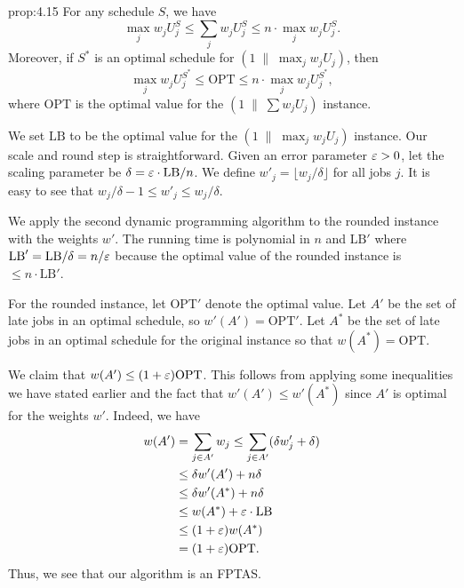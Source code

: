 \begin{prop}{prop:4.15}
    For any schedule $S$, we have 
    \[ \max_j w_j U_j^S \leq \sum_j w_j U_j^S \leq n \cdot \max_j w_j U_j^S. \] 
    Moreover, if $S^*$ is an optimal schedule for $(1\;\|\;\max_j w_jU_j)$, then 
    \[ \max_j w_j U_j^{S^*} \leq \text{OPT} \leq n \cdot \max_j w_j U_j^{S^*}, \] 
    where $\text{OPT}$ is the optimal value for the $(1\;\|\;\sum w_j U_j)$ instance. 
\end{prop}

We set $\text{LB}$ to be the optimal value for the $(1\;\|\;\max_j w_j U_j)$ 
instance. Our scale and round step is straightforward. Given an error 
parameter $\varepsilon > 0$, let the scaling parameter be $\delta = \varepsilon \cdot 
\text{LB}/n$. We define $w'_j = \lfloor w_j/\delta \rfloor$ for all jobs $j$. 
It is easy to see that $w_j/\delta - 1 \leq w'_j \leq w_j/\delta$. 

We apply the second dynamic programming algorithm to the rounded instance 
with the weights $w'$. The running time is polynomial in $n$ and 
$\text{LB}'$ where $\text{LB}' = \text{LB}/\delta = n/\varepsilon$ because 
the optimal value of the rounded instance is $\leq n \cdot \text{LB}'$.

For the rounded instance, let $\text{OPT}'$ denote the optimal value. 
Let $A'$ be the set of late jobs in an optimal schedule, so $w'(A') = 
\text{OPT}'$. Let $A^*$ be the set of late jobs in an optimal schedule for 
the original instance so that $w(A^*) = \text{OPT}$. 

We claim that $w(A') \leq (1+\varepsilon) \text{OPT}$. This follows from applying some
inequalities we have stated earlier and the fact that $w'(A') \leq w'(A^*)$ 
since $A'$ is optimal for the weights $w'$. Indeed, we have 
\begin{align*} 
    w(A') &= \sum_{j\in A'} w_j \leq \sum_{j\in A'} (\delta w'_j + \delta) \\
    &\leq \delta w'(A') + n\delta \\ 
    &\leq \delta w'(A^*) + n\delta \\
    &\leq w(A^*) + \varepsilon \cdot \text{LB} \\ 
    &\leq (1 + \varepsilon) w(A^*) \\ 
    &= (1 + \varepsilon) \text{OPT}. 
\end{align*}
Thus, we see that our algorithm is an FPTAS. 



